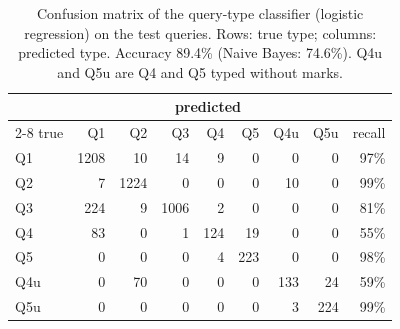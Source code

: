 \begin{table}[t]
\centering
\caption{Confusion matrix of the query-type classifier (logistic regression) on the test queries. Rows: true type;
columns: predicted type. Accuracy 89.4\%
(Naive Bayes: 74.6\%). Q4u and Q5u are Q4 and Q5 typed without marks.}
\label{tab:qtype}
\small
\begin{tabular}{@{}lrrrrrrrr@{}}
\toprule
 & \multicolumn{7}{c}{predicted} & \\
\cmidrule(lr){2-8}
true & Q1 & Q2 & Q3 & Q4 & Q5 & Q4u & Q5u & recall \\
\midrule
Q1 & 1208 & 10 & 14 & 9 & 0 & 0 & 0 & 97\% \\
Q2 & 7 & 1224 & 0 & 0 & 0 & 10 & 0 & 99\% \\
Q3 & 224 & 9 & 1006 & 2 & 0 & 0 & 0 & 81\% \\
Q4 & 83 & 0 & 1 & 124 & 19 & 0 & 0 & 55\% \\
Q5 & 0 & 0 & 0 & 4 & 223 & 0 & 0 & 98\% \\
Q4u & 0 & 70 & 0 & 0 & 0 & 133 & 24 & 59\% \\
Q5u & 0 & 0 & 0 & 0 & 0 & 3 & 224 & 99\% \\
\bottomrule
\end{tabular}
\end{table}
